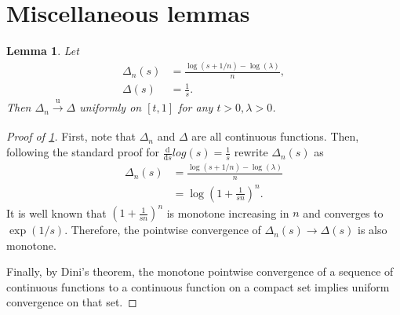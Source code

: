 \documentclass[a4paper]{article}
\newtheorem{lemma}{Lemma}
\begin{document}
\appendix

\printbibliography

\section{Miscellaneous lemmas}

\begin{lemma}
    \label{lemma:log_convergence}
    Let 
    \begin{align*}
        \Delta_n(s) &= \frac{\log(s + 1/n) - \log(\lambda)}{n}, \\
        \Delta(s) &= \frac{1}{s}.
    \end{align*}
    Then $\Delta_n \xrightarrow[]{\mathrm{u}} \Delta$ uniformly on $[t, 1]$ for any $t > 0, \lambda > 0$.
\end{lemma}
\begin{proof}[Proof of \cref{lemma:log_convergence}]
    First, note that $\Delta_n$ and $\Delta$ are all continuous functions.
    Then, following the standard proof for $\frac{\mathrm{d}}{\mathrm{d}s}log(s) = \frac{1}{s}$ rewrite $\Delta_n(s)$ as
    \begin{align*}
        \Delta_n(s) &= \frac{\log(s + 1/n) - \log(\lambda)}{n} \\
        &= \log \left( 1 + \frac{1}{sn} \right) ^ n .
    \end{align*}
    It is well known that $\left( 1 + \frac{1}{sn} \right) ^ n$ is monotone increasing in $n$ and converges to $\exp (1/s)$.
    Therefore, the pointwise convergence of $\Delta_n(s) \to \Delta(s)$ is also monotone.

    Finally, by Dini's theorem, the monotone pointwise convergence of a sequence of continuous functions to a continuous function on a compact set implies uniform convergence on that set.
\end{proof}
\end{document}
